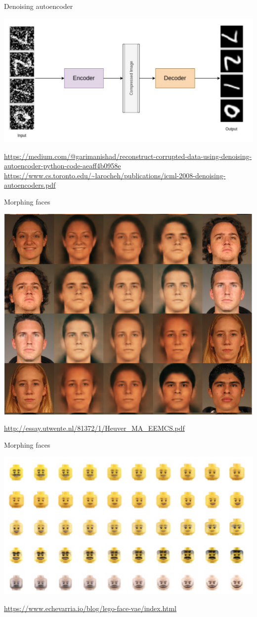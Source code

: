 \documentclass[notes,12pt, aspectratio=169]{beamer}
\begin{document}
\begin{frame}{Denoising autoencoder}
\begin{center}
	\includegraphics[width=.8\linewidth]{denoise.png}
\end{center}
\vfill
\footnotesize
{\color{blue} \url{https://medium.com/@garimanishad/reconstruct-corrupted-data-using-denoising-autoencoder-python-code-aeaff4b0958e} \newline \url{https://www.cs.toronto.edu/~larocheh/publications/icml-2008-denoising-autoencoders.pdf} } 
\end{frame}


\begin{frame}{Morphing faces}
\begin{center}
	\includegraphics[width=.5\linewidth]{morth.png}
\end{center}
\vfill
\footnotesize
{\color{blue} \url{http://essay.utwente.nl/81372/1/Heuver_MA_EEMCS.pdf}  } 
\end{frame}


\begin{frame}{Morphing faces}
\begin{center}
	\includegraphics[width=.85\linewidth]{lego.png}
\end{center}
\vfill
\footnotesize
{\color{blue} \url{https://www.echevarria.io/blog/lego-face-vae/index.html}  } 
\end{frame}
\end{document}

